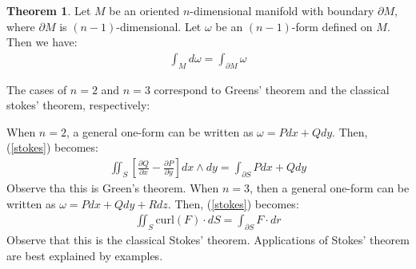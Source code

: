 \documentclass[11pt]{scrartcl}
\theoremstyle{definition}
\newtheorem{theorem}{Theorem}
\theoremstyle{remark}
\newcommand{\idx}[2]{\int_{#1}^{#2}}
\begin{document}
{\begin{theorem}
	Let $M$ be an oriented $n$-dimensional manifold with boundary $\partial M$, where $\partial M$ is $(n-1)$-dimensional. Let $\omega$ be an $(n-1)$-form defined on $M$. Then we have: 
	\begin{align}\label{stokes} 
		\idx{M}{} d \omega = \idx{\partial M}{} \omega 	
	\end{align}
\end{theorem}

The cases of $n=2$ and $n=3$ correspond to Greens' theorem and the classical stokes' theorem, respectively: 

When $n=2$, a general one-form can be written as $\omega = Pdx + Qdy$. Then, (\ref{stokes}) becomes: 
\begin{align}
	\iint_S \left[ \frac{\partial{Q}}{\partial x } - \frac{\partial P}{\partial y} \right] dx \wedge dy = \idx{\partial S}{} P dx + Q dy
\end{align}
Observe tha this is Green's theorem. When $n=3$, then a general one-form can be written as $\omega = P dx + Q dy + R dz$. Then, (\ref{stokes}) becomes: 
\begin{align}
	\iint_S \text{curl}(F) \cdot dS = \idx{\partial S}{} F \cdot dr	
\end{align}
Observe that this is the classical Stokes' theorem. Applications of Stokes' theorem are best explained by examples. 

}
\end{document}
